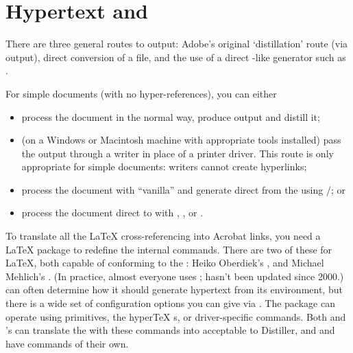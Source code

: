 
\section{Hypertext and }


There are three general routes to  output: Adobe's original
`distillation' route (via \PS{} output), direct conversion of a
 file, and the use of a direct \tex{}-like 
generator such as .

For simple documents (with no hyper-references), you can either
\begin{itemize}
\item process the document in the normal way, produce \PS{}
  output and distill it;
\item (on a Windows or Macintosh machine with appropriate
  tools installed) pass the output through a writer in place
  of a printer driver.  This route is only appropriate for simple
  documents:  writers cannot create hyperlinks;
\item process the document with ``vanilla'' \latex{} and generate 
  direct from the  using /; or 
\item process the document direct to  with \PDFTeX{},
  , or .
\end{itemize}

To translate all the \LaTeX{} cross-referencing into Acrobat
links, you need a \LaTeX{} package to redefine
the internal commands.  There are two of these for \LaTeX{}, both
capable of conforming to the
:
Heiko Oberdiek's , and Michael Mehlich's
.  (In practice, almost everyone uses
;  hasn't been updated since 2000.)
 can often determine how it should generate
hypertext from its environment, but there is a wide set of
configuration options you can give via .  The package
can operate using \PDFTeX{} primitives, the hyper\TeX{}
s, or  driver-specific  commands.
Both  and \YandY{}'s  can
translate the  with these  commands into
\PS{} acceptable to Distiller, and
 and  have  commands of
their own.

